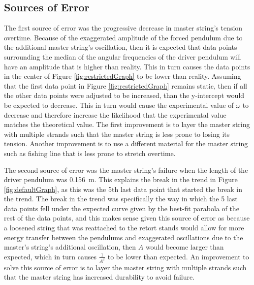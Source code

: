 \documentclass[letterpaper, 12pt]{article}
\begin{document}
\subsection{Sources of Error}

The first source of error was the progressive decrease
in master string's tension overtime. Because of the
exaggerated amplitude of the forced pendulum
due to the additional master string's oscillation,
then it is expected that data points surrounding
the median of the angular frequencies of the driver
pendulum will have an amplitude that is higher
than reality. This in turn causes the
data points in the center of Figure \ref*{fig:restrictedGraph}
to be lower than reality. Assuming that the first
data point in Figure \ref*{fig:restrictedGraph}
remains static, then if all the other data points
were adjusted to be increased, than the y-intercept
would be expected to decrease. This in turn would
cause the experimental value of \(\omega\) to decrease
and therefore increase the likelihood that
the experimental value matches the theoretical value.
The first improvement is to layer the master string
with multiple strands such that the master string
is less prone to losing its tension. Another
improvement is to use a different material
for the master string such as fishing line
that is less prone to stretch overtime.

The second source of error was the master string's failure
when the length of the driver pendulum was \SI{0.156}{m}.
This explains the break in the trend in Figure \ref*{fig:defaultGraph},
as this was the 5th last data point that started the
break in the trend. The break in the trend was specifically
the way in which the 5 last data points fell under
the expected curve given by the best-fit parabola
of the rest of the data points, and this makes
sense given this source of error as because a loosened
string that was reattached to the retort stands
would allow for more energy transfer between the
pendulums and exaggerated oscillations due to the
master's string's additional oscillation, then
\(A\) would become larger than expected,
which in turn causes \(\frac{1}{A^2}\)
to be lower than expected. An improvement
to solve this source of error is to layer
the master string with multiple strands such
that the master string has increased durability
to avoid failure.





\end{document}
